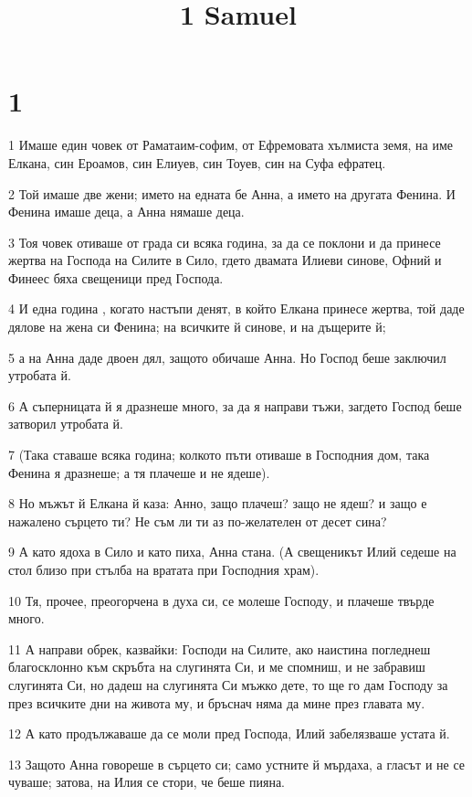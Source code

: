 

\title{1 Samuel}


\chapter{1}

\par 1 Имаше един човек от Раматаим-софим, от Ефремовата хълмиста земя, на име Елкана, син Ероамов, син Елиуев, син Тоуев, син на Суфа ефратец.
\par 2 Той имаше две жени; името на едната бе Анна, а името на другата Фенина. И Фенина имаше деца, а Анна нямаше деца.
\par 3 Тоя човек отиваше от града си всяка година, за да се поклони и да принесе жертва на Господа на Силите в Сило, гдето двамата Илиеви синове, Офний и Финеес бяха свещеници пред Господа.
\par 4 И една година , когато настъпи денят, в който Елкана принесе жертва, той даде дялове на жена си Фенина; на всичките й синове, и на дъщерите й;
\par 5 а на Анна даде двоен дял, защото обичаше Анна. Но Господ беше заключил утробата й.
\par 6 А съперницата й я дразнеше много, за да я направи тъжи, загдето Господ беше затворил утробата й.
\par 7 (Така ставаше всяка година; колкото пъти отиваше в Господния дом, така Фенина я дразнеше; а тя плачеше и не ядеше).
\par 8 Но мъжът й Елкана й каза: Анно, защо плачеш? защо не ядеш? и защо е нажалено сърцето ти? Не съм ли ти аз по-желателен от десет сина?
\par 9 А като ядоха в Сило и като пиха, Анна стана. (А свещеникът Илий седеше на стол близо при стълба на вратата при Господния храм).
\par 10 Тя, прочее, преогорчена в духа си, се молеше Господу, и плачеше твърде много.
\par 11 А направи обрек, казвайки: Господи на Силите, ако наистина погледнеш благосклонно към скръбта на слугинята Си, и ме спомниш, и не забравиш слугинята Си, но дадеш на слугинята Си мъжко дете, то ще го дам Господу за през всичките дни на живота му, и бръснач няма да мине през главата му.
\par 12 А като продължаваше да се моли пред Господа, Илий забелязваше устата й.
\par 13 Защото Анна говореше в сърцето си; само устните й мърдаха, а гласът и не се чуваше; затова, на Илия се стори, че беше пияна.
